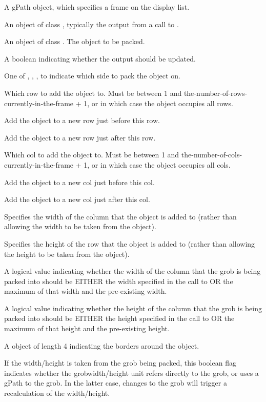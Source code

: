 %
\begin{Arguments}
\begin{ldescription}
\item[\code{gPath}]  A gPath object, which specifies a frame on the
display list.
\item[\code{frame}]  An object of class , typically the output
from a call to . 
\item[\code{grob}]  An object of class .  The object to be
packed. 
\item[\code{redraw}]  A boolean indicating whether the output should be updated. 
\item[\code{side}]  One of , , ,
 to indicate which side to pack the object on. 
\item[\code{row}]  Which row to add the object to.  Must be between 1 and
the-number-of-rows-currently-in-the-frame + 1, or  in
which case the object occupies all rows. 
\item[\code{row.before}]  Add the object to a new row just before this row. 
\item[\code{row.after}]  Add the object to a new row just after this row. 
\item[\code{col}]  Which col to add the object to.  Must be between 1 and
the-number-of-cols-currently-in-the-frame + 1, or  in
which case the object occupies all cols.  
\item[\code{col.before}] Add the object to a new col just before this col.
\item[\code{col.after}]  Add the object to a new col just after this col. 
\item[\code{width}]  Specifies the width of the column that the object is
added to (rather than allowing the width to be taken from the object). 
\item[\code{height}]  Specifies the height of the row that the object is
added to (rather than allowing the height to be taken from the
object). 
\item[\code{force.width}]  A logical value indicating whether the width of
the column that the grob is being packed into should be EITHER the
width specified in the call to  OR the maximum of
that width and the pre-existing width. 
\item[\code{force.height}]  A logical value indicating whether the height of
the column that the grob is being packed into should be EITHER the
height specified in the call to  OR the maximum of
that height and the pre-existing height. 
\item[\code{border}]  A  object of length 4 indicating the borders
around the object. 
\item[\code{dynamic}]  If the width/height is taken from the grob being
packed, this boolean flag indicates whether the grobwidth/height
unit refers directly to the grob, or uses a gPath to the grob.
In the latter case, changes to the grob will trigger a
recalculation of the width/height.
\end{ldescription}
\end{Arguments}
